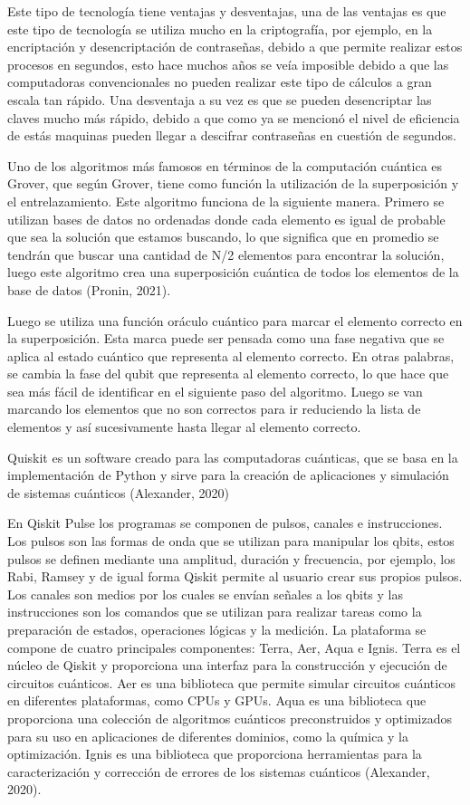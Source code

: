 \documentclass[twoside]{article}
\begin{document}
Este tipo de tecnología tiene ventajas y desventajas, una de las ventajas es que este tipo de tecnología se utiliza mucho en la criptografía, por ejemplo, en la encriptación y desencriptación de contraseñas, debido a que permite realizar estos procesos en segundos, esto hace muchos años se veía imposible debido a que las computadoras convencionales no pueden realizar este tipo de cálculos a gran escala tan rápido. Una desventaja a su vez es que se pueden desencriptar las claves mucho más rápido, debido a que como ya se mencionó el nivel de eficiencia de estás maquinas pueden llegar a descifrar contraseñas en cuestión de segundos. 

Uno de los algoritmos más famosos en términos de la computación cuántica es Grover, que según Grover, tiene como función la utilización de la superposición y el entrelazamiento. Este algoritmo funciona de la siguiente manera. Primero se utilizan bases de datos no ordenadas donde cada elemento es igual de probable que sea la solución que estamos buscando, lo que significa que en promedio se tendrán que buscar una cantidad de N/2 elementos para encontrar la solución, luego este algoritmo crea una superposición cuántica de todos los elementos de la base de datos (Pronin, 2021).

Luego se utiliza una función oráculo cuántico para marcar el elemento correcto en la superposición. Esta marca puede ser pensada como una fase negativa que se aplica al estado cuántico que representa al elemento correcto. En otras palabras, se cambia la fase del qubit que representa al elemento correcto, lo que hace que sea más fácil de identificar en el siguiente paso del algoritmo. Luego se van marcando los elementos que no son correctos para ir reduciendo la lista de elementos y así sucesivamente hasta llegar al elemento correcto. 

Quiskit es un software creado para las computadoras cuánticas, que se basa en la implementación de Python y sirve para la creación de aplicaciones y simulación de sistemas cuánticos (Alexander, 2020)

En Qiskit Pulse los programas se componen de pulsos, canales e instrucciones. Los pulsos son las formas de onda que se utilizan para manipular los qbits, estos pulsos se definen mediante una amplitud, duración y frecuencia, por ejemplo, los Rabi, Ramsey y de igual forma Qiskit permite al usuario crear sus propios pulsos. Los canales son medios por los cuales se envían señales a los qbits y las instrucciones son los comandos que se utilizan para realizar tareas como la preparación de estados, operaciones lógicas y la medición.
La plataforma se compone de cuatro principales componentes: Terra, Aer, Aqua e Ignis. Terra es el núcleo de Qiskit y proporciona una interfaz para la construcción y ejecución de circuitos cuánticos. Aer es una biblioteca que permite simular circuitos cuánticos en diferentes plataformas, como CPUs y GPUs. Aqua es una biblioteca que proporciona una colección de algoritmos cuánticos preconstruidos y optimizados para su uso en aplicaciones de diferentes dominios, como la química y la optimización. Ignis es una biblioteca que proporciona herramientas para la caracterización y corrección de errores de los sistemas cuánticos (Alexander, 2020). 
\end{document}
